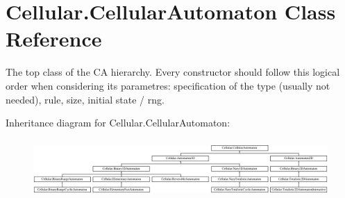\hypertarget{class_cellular_1_1_cellular_automaton}{}\section{Cellular.\+Cellular\+Automaton Class Reference}
\label{class_cellular_1_1_cellular_automaton}


The top class of the C\+A hierarchy. Every constructor should follow this logical order when considering its parametres\+: specification of the type (usually not needed), rule, size, initial state / rng.  


Inheritance diagram for Cellular.\+Cellular\+Automaton\+:\begin{figure}[H]
\begin{center}
\leavevmode
\includegraphics[height=2.231076cm]{class_cellular_1_1_cellular_automaton}
\end{center}
\end{figure}
